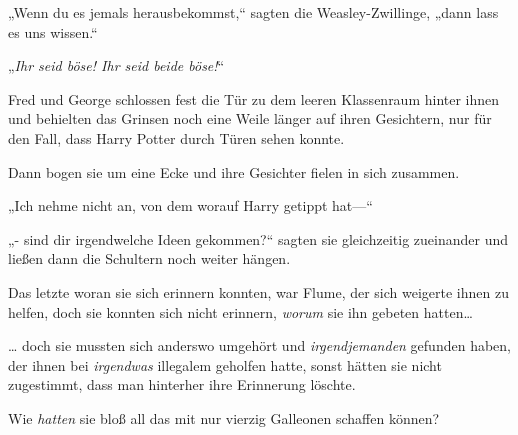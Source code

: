 „Wenn du es jemals herausbekommst,“ sagten die Weasley-Zwillinge, „dann lass es uns wissen.“

„\emph{Ihr seid böse! Ihr seid beide böse!}“

Fred und George schlossen fest die Tür zu dem leeren Klassenraum hinter ihnen und behielten das Grinsen noch eine Weile länger auf ihren Gesichtern, nur für den Fall, dass Harry Potter durch Türen sehen konnte.

Dann bogen sie um eine Ecke und ihre Gesichter fielen in sich zusammen.

„Ich nehme nicht an, von dem worauf Harry getippt hat—“

„- sind dir irgendwelche Ideen gekommen?“ sagten sie gleichzeitig zueinander und ließen dann die Schultern noch weiter hängen.

Das letzte woran sie sich erinnern konnten, war Flume, der sich weigerte ihnen zu helfen, doch sie konnten sich nicht erinnern, \emph{worum} sie ihn gebeten hatten…

… doch sie mussten sich anderswo umgehört und \emph{irgendjemanden} gefunden haben, der ihnen bei \emph{irgendwas} illegalem geholfen hatte, sonst hätten sie nicht zugestimmt, dass man hinterher ihre Erinnerung löschte.

Wie \emph{hatten} sie bloß all das mit nur vierzig Galleonen schaffen können?

